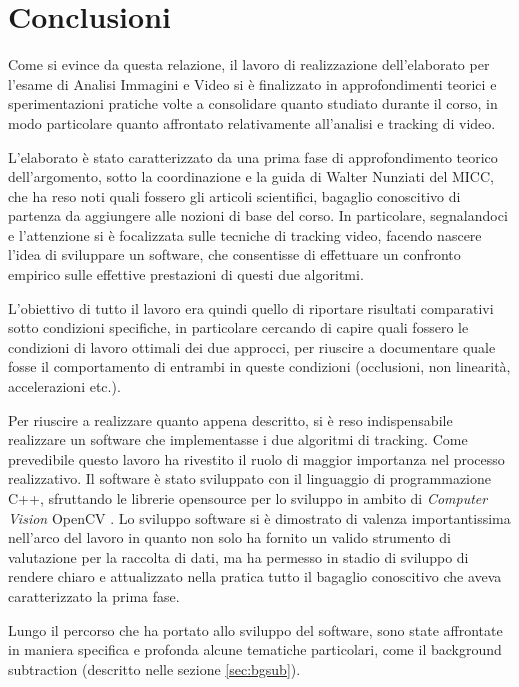 \section{Conclusioni}

Come si evince da questa relazione, il lavoro di realizzazione dell'elaborato per l'esame di Analisi Immagini e Video si è finalizzato in approfondimenti teorici e sperimentazioni pratiche volte a consolidare quanto studiato durante il corso, in modo particolare quanto affrontato relativamente all'analisi e tracking di video. 

L'elaborato è stato caratterizzato da una prima fase di approfondimento teorico dell'argomento, sotto la coordinazione e la guida di Walter Nunziati del MICC, che ha reso noti quali fossero gli articoli scientifici, bagaglio conoscitivo di partenza da aggiungere alle nozioni di base del corso. In particolare, segnalandoci \cite{kalman-intro} e \cite{condensation} l'attenzione si è focalizzata sulle tecniche di tracking video, facendo nascere l'idea di sviluppare un software, che consentisse di effettuare un confronto empirico sulle effettive prestazioni di questi due algoritmi.

L'obiettivo di tutto il lavoro era quindi quello di riportare risultati comparativi sotto condizioni specifiche, in particolare cercando di capire quali fossero le condizioni di lavoro ottimali dei due approcci, per riuscire a documentare quale fosse il comportamento di entrambi in queste condizioni (occlusioni, non linearità, accelerazioni etc.).

Per riuscire a realizzare quanto appena descritto, si è reso indispensabile realizzare un software che implementasse i due algoritmi di tracking. Come prevedibile questo lavoro ha rivestito il ruolo di maggior importanza nel processo realizzativo. Il software è stato sviluppato con il linguaggio di programmazione C++, sfruttando le librerie opensource per lo sviluppo in ambito di \emph{Computer Vision} OpenCV \cite{opencv}. Lo sviluppo software si è dimostrato di valenza importantissima nell'arco del lavoro in quanto non solo ha fornito un valido strumento di valutazione per la raccolta di dati, ma ha permesso in stadio di sviluppo di rendere chiaro e attualizzato nella pratica tutto il bagaglio conoscitivo che aveva caratterizzato la prima fase.

Lungo il percorso che ha portato allo sviluppo del software, sono state affrontate in maniera specifica e profonda alcune tematiche particolari, come il background subtraction (descritto nelle sezione \ref{sec:bgsub}).

